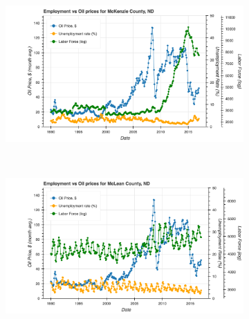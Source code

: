 \documentclass[11pt,letterpaper]{article}
\begin{document}
\begin{figure}
\centering
\begin{subfigure}{0.45\textwidth}
\includegraphics[width=1.1\linewidth]{nd_mckenzie_oil_price}
\end{subfigure}
~
\begin{subfigure}{0.45\textwidth}
\includegraphics[width=\linewidth]{nd_mclean_oil_price}
\end{subfigure}


\end{figure}
\end{document}
